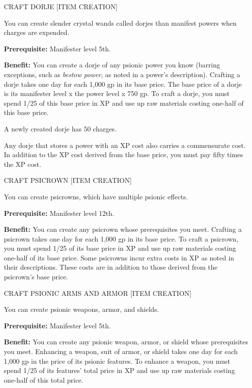 \documentclass{article}
\begin{document}
\vspace{12pt}
CRAFT DORJE [ITEM CREATION]

You can create slender crystal wands called dorjes than manifest powers when charges 
are expended.

\textbf{Prerequisite:} Manifester level 5th.

\textbf{Benefit:} You can create a dorje of any psionic power you know (barring 
exceptions, such as \textit{bestow power}, as noted in a power's description). 
Crafting a dorje takes one day for each 1,000 gp in its base price. The base price 
of a dorje is its manifester level x the power level x 750 gp. To craft a dorje, 
you must spend 1/25 of this base price in XP and use up raw materials costing one-half 
of this base price.

A newly created dorje has 50 charges.

Any dorje that stores a power with an XP cost also carries a commensurate cost. 
In addition to the XP cost derived from the base price, you must pay fifty times 
the XP cost.

\vspace{12pt}
CRAFT PSICROWN [ITEM CREATION]

You can create psicrowns, which have multiple psionic effects.

\textbf{Prerequisite:} Manifester level 12th.

\textbf{Benefit:} You can create any psicrown whose prerequisites you meet. Crafting 
a psicrown takes one day for each 1,000 gp in its base price. To craft a psicrown, 
you must spend 1/25 of its base price in XP and use up raw materials costing one-half 
of its base price. Some psicrowns incur extra costs in XP as noted in their descriptions. 
These costs are in addition to those derived from the psicrown's base price.

\vspace{12pt}
CRAFT PSIONIC ARMS AND ARMOR [ITEM CREATION]

You can create psionic weapons, armor, and shields.

\textbf{Prerequisite:} Manifester level 5th.

\textbf{Benefit:} You can create any psionic weapon, armor, or shield whose prerequisites 
you meet. Enhancing a weapon, suit of armor, or shield takes one day for each 1,000 
gp in the price of its psionic features. To enhance a weapon, you must spend 1/25 
of its features' total price in XP and use up raw materials costing one-half of 
this total price.
\end{document}
